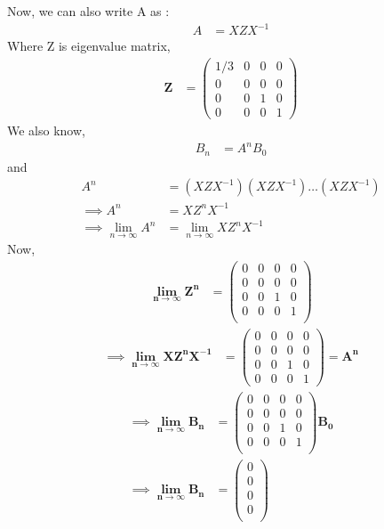 \documentclass[journal,12pt,onecolumn]{IEEEtran}
\begin{document}
Now, we can also write A as :\\
\begin{align}
A &= XZX^{-1}
\end{align}
Where Z is eigenvalue matrix,\\
\begin{align}
\mathbf{Z} &=
\begin{pmatrix}
1/3 & 0 & 0 & 0\\
0 & 0 & 0 & 0\\
0 & 0 & 1 & 0\\
0 & 0 & 0 & 1
\end{pmatrix}
\end{align}
We also know,
\begin{align}
B_n &= A^{n}B_0
\end{align}
and
\begin{align}
A^{n} &= (XZX^{-1})(XZX^{-1}) \dots (XZX^{-1})\\
\implies A^{n} &= XZ^{n}X^{-1}\\
\implies \lim_{n \to \infty}A^{n} &= \lim_{n \to \infty}XZ^{n}X^{-1}
\end{align}
Now,
\begin{align}
\mathbf{\lim_{n \to \infty}Z^{n}} &= 
\begin{pmatrix}
0 & 0 & 0 & 0\\
0 & 0 & 0 & 0\\
0 & 0 & 1 & 0\\
0 & 0 & 0 & 1\\
\end{pmatrix}
\end{align}
\begin{align}
\implies \mathbf{\lim_{n \to \infty}XZ^{n}X^{-1}} &= 
\begin{pmatrix}
0 & 0 & 0 & 0\\
0 & 0 & 0 & 0\\
0 & 0 & 1 & 0\\
0 & 0 & 0 & 1
\end{pmatrix}
 = \mathbf{A^{n}}
 \end{align}
\begin{align}
\implies \mathbf{\lim_{n \to \infty}B_n} &=
\begin{pmatrix}
0 & 0 & 0 & 0\\
0 & 0 & 0 & 0\\
0 & 0 & 1 & 0\\
0 & 0 & 0 & 1\\
\end{pmatrix} \mathbf{B_0}\\
\label{eq:5}
\implies \mathbf{\lim_{n \to \infty}B_n} &= 
\begin{pmatrix}
0 \\[4pt]
0\\[4pt]
0\\[4pt]
0\\[4pt]
\end{pmatrix}
\end{align}
\end{document}
